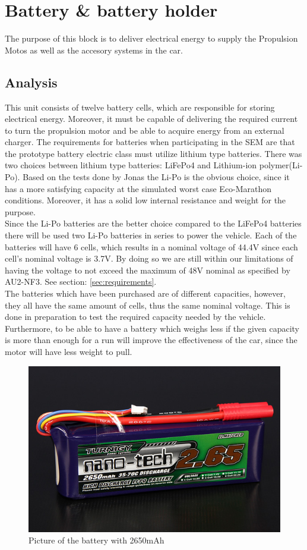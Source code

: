 \section{Battery \& battery holder}
The purpose of this block is to deliver electrical energy to supply the  Propulsion Motos as well as the accesory systems in the car.

\subsection{Analysis}
This unit consists of twelve battery cells, which are responsible for storing electrical energy. Moreover, it must be capable of delivering the required current to turn the propulsion motor and be able to acquire energy from an external charger.   
The requirements for batteries when participating in the SEM are that the prototype battery electric class must utilize lithium type batteries. There was two choices between lithium type batteries: LiFePo4 and Lithium-ion polymer(Li-Po). Based on the tests done by Jonas  the Li-Po is the obvious choice, since it has a more satisfying capacity at the simulated worst case Eco-Marathon conditions. Moreover, it has a solid low internal resistance and weight for the purpose.\\
Since the Li-Po batteries are the better choice compared to the LiFePo4 batteries there will be used two Li-Po batteries in series to power the vehicle. Each of the batteries will have 6 cells, which results in a nominal voltage of 44.4V since each cell's nominal voltage is 3.7V. By doing so we are still within our limitations of having the voltage to not exceed the maximum of 48V nominal as specified by AU2-NF3. See section: \ref{sec:requirements}.\\
The batteries which have been purchased are of different capacities, however, they all have the same amount of cells, thus the same nominal voltage. This is done in preparation to test the required capacity needed by the vehicle. Furthermore, to be able to have a battery which weighs less if the given capacity is more than enough for a run will improve the effectiveness of the car, since the motor will have less weight to pull.\\

\begin{figure}[H]
	\centering
	\includegraphics[width=0.6\linewidth]{Hardware/Pictures/2650battery}
	\caption[Empty]{Picture of the battery with 2650mAh\footnotemark}
	\label{fig:2650battery}
\end{figure}

